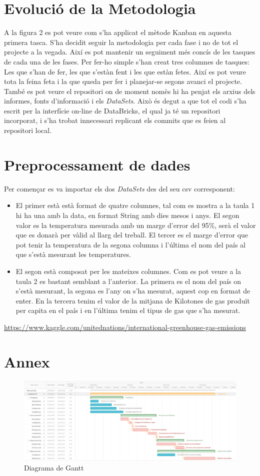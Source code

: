 \documentclass[10pt,a4paper,twocolumn,twoside]{article}
\begin{document}
\section{Evolució de la Metodologia}
A la figura 2 es pot veure com s'ha applicat el mètode Kanban en aquesta primera tasca. S'ha decidit seguir la metodologia per cada fase i no de tot el projecte a la vegada. Així es pot mantenir un seguiment més concís de les tasques de cada una de les fases. Per fer-ho simple s'han creat tres columnes de tasques: Les que s'han de fer, les que s'estàn fent i les que estàn fetes. Així es pot veure tota la feina feta i la que queda per fer i planejar-se segons avanci el projecte. També es pot veure el repositori on de moment nomès hi ha penjat els arxius dels informes, fonts d'informació i els \textit{DataSets}. Això és degut a que tot el codi s'ha escrit per la interfície on-line de DataBricks, el qual ja té un repositori incorporat, i s'ha trobat innecessari replicant els commits que es feien al repositori local.
\section{Preprocessament de dades}
Per començar es va importar els dos \textit{DataSets} des del seu csv corresponent:
\begin{itemize}
\item El primer està  està format de quatre columnes, tal com es mostra a la taula 1 hi ha una amb la data, en format String amb dies mesos i anys. El segon valor es la temperatura mesurada amb un marge d'error del 95\%, serà el valor que es donarà per vàlid al llarg del treball. El tercer es el marge d'error que pot tenir la temperatura de la segona columna i l'última el nom del país al que s'està mesurant les temperatures.
\item El segon està composat per les mateixes columnes. Com es pot veure a la taula 2 es bastant semblant a l'anterior. La primera es el nom del país on s'està mesurant, la segona es l'any on s'ha mesurat, aquest cop en format de enter. En la tercera tenim el valor de la mitjana de Kilotones de gas produït per capita en el país i en l'última tenim el tipus de gas que s'ha mesurat.
\end{itemize}

\begin{thebibliography}{11}
\url{https://www.kaggle.com/unitednations/international-greenhouse-gas-emissions}

\end{thebibliography}
\clearpage
\section{Annex}

\begin{figure}[!h]
\centering
	\includegraphics[width=1\textwidth]{img/diagrama_Gantt}

	\caption{Diagrama de Gantt}
	\label{fig-Gantt}
\end{figure}
\end{document}

